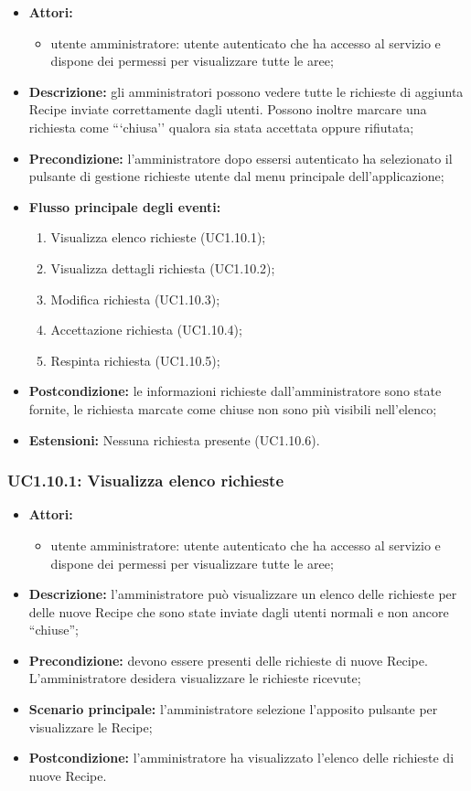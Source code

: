 \begin{itemize}
	\item \textbf{Attori:}
	\begin{itemize}
		\item utente amministratore: utente autenticato che ha accesso al servizio e dispone dei permessi per visualizzare tutte le aree;
	\end{itemize}
	\item \textbf{Descrizione:} gli amministratori possono vedere tutte le richieste di aggiunta Recipe inviate correttamente dagli utenti. Possono inoltre marcare una richiesta come ```chiusa'' qualora sia stata accettata oppure rifiutata;
	\item \textbf{Precondizione:} l'amministratore dopo essersi autenticato ha selezionato il pulsante di gestione richieste utente dal menu principale dell'applicazione;
	\item \textbf{Flusso principale degli eventi:}
	\begin{enumerate}
		\item Visualizza elenco richieste (UC1.10.1);
		\item Visualizza dettagli richiesta (UC1.10.2);
		\item Modifica richiesta (UC1.10.3);
		\item Accettazione richiesta (UC1.10.4);
		\item Respinta richiesta (UC1.10.5);
	\end{enumerate}
	\item \textbf{Postcondizione:} le informazioni richieste dall'amministratore sono state fornite, le richiesta marcate come chiuse non sono più visibili nell'elenco;
	\item \textbf{Estensioni:} Nessuna richiesta presente (UC1.10.6).
\end{itemize}

\subsubsection{UC1.10.1: Visualizza elenco richieste}
	\begin{itemize}
		\item \textbf{Attori:}
		\begin{itemize}
			\item utente amministratore: utente autenticato che ha accesso al servizio e dispone dei permessi per visualizzare tutte le aree;
		\end{itemize}
		\item \textbf{Descrizione:} l'amministratore può visualizzare un elenco delle richieste per delle nuove Recipe che sono state inviate dagli utenti normali e non ancore ``chiuse'';
		\item \textbf{Precondizione:} devono essere presenti delle richieste di nuove Recipe. L'amministratore desidera visualizzare le richieste ricevute;
		\item \textbf{Scenario principale:} l'amministratore selezione l'apposito pulsante per visualizzare le Recipe;
		\item \textbf{Postcondizione:} l'amministratore ha visualizzato l'elenco delle richieste di nuove Recipe.
	\end{itemize}

